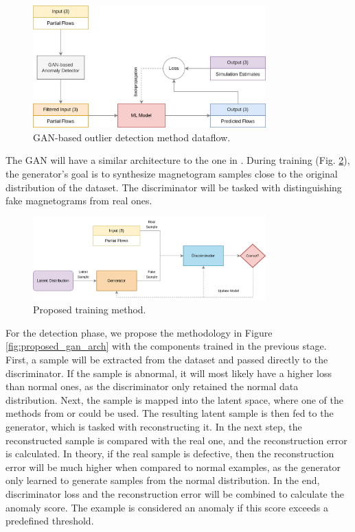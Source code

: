 \begin{figure}[ht]
\centering
\includegraphics[width=0.8\textwidth]{figures/gan_rnn_multivp.png}
\caption{GAN-based outlier detection method dataflow.}
\label{fig:gan_rnn_multivp}
\end{figure}

The GAN will have a similar architecture to the one in \cite{goodfellow.etal_GenerativeAdversarialNets_}. During training (Fig. \ref{fig:proposed_gan_train}), the generator's goal is to synthesize magnetogram samples close to the original distribution of the dataset. The discriminator will be tasked with distinguishing fake magnetograms from real ones. %

\begin{figure}[ht]
    \centering
    \includegraphics[width=0.8\textwidth]{figures/gan_arch_train.png}
    \caption{Proposed training method.}
    \label{fig:proposed_gan_train}
\end{figure}

For the detection phase, we propose the methodology in Figure \ref{fig:proposed_gan_arch} with the components trained in the previous stage. First, a sample will be extracted from the dataset and passed directly to the discriminator. If the sample is abnormal, it will most likely have a higher loss than normal ones, as the discriminator only retained the normal data distribution. Next, the sample is mapped into the latent space, where one of the methods from \cite{li.etal_MADGANMultivariateAnomaly_2019} or \cite{bashar.nayak_TAnoGANTimeSeries_2020} could be used. The resulting latent sample is then fed to the generator, which is tasked with reconstructing it. In the next step, the reconstructed sample is compared with the real one, and the reconstruction error is calculated. In theory, if the real sample is defective, then the reconstruction error will be much higher when compared to normal examples, as the generator only learned to generate samples from the normal distribution. In the end, discriminator loss and the reconstruction error will be combined to calculate the anomaly score. The example is considered an anomaly if this score exceeds a predefined threshold.

